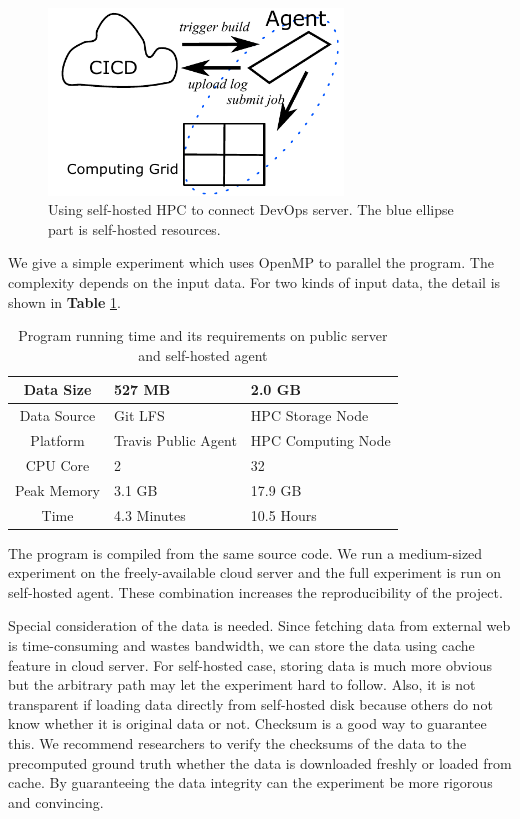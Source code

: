 \documentclass{IEEEcsmag}
\begin{document}
\begin{figure}[!ht]
\centerline{\includegraphics[width=18.5pc]{self-hosted.pdf}}
\caption{Using self-hosted HPC to connect DevOps server. The blue ellipse part is self-hosted resources.}\label{fig:selfhosted}
\end{figure}

We give a simple experiment which uses OpenMP to parallel the program. The complexity depends on the input data. For two kinds of input data, the detail is shown in {\bf Table} \ref{tab:time}.
\begin{table}
\centering
\begin{tabular}{|c|p{1.5cm}|p{1.5cm}|}
\hline
Data Size & 527 MB & 2.0 GB\\
\hline
Data Source & Git LFS & HPC Storage Node \\
\hline
Platform & Travis Public Agent & HPC Computing Node \\
\hline
CPU Core & 2 & 32  \\ 
\hline
Peak Memory  & 3.1 GB  & 17.9 GB\\ 
\hline
Time & 4.3 Minutes & 10.5 Hours \\
\hline
\end{tabular}
\caption{Program running time and its requirements on public server and self-hosted agent}\label{tab:time}
\end{table}

The program is compiled from the same source code. We run a medium-sized experiment on the freely-available cloud server and the full experiment is run on self-hosted agent. These combination increases the reproducibility of the project.

Special consideration of the data is needed. Since fetching data from external web is time-consuming and wastes bandwidth, we can store the data using cache feature in cloud server. For self-hosted case, storing data is much more obvious but the arbitrary path may let the experiment hard to follow. Also, it is not transparent if loading data directly from self-hosted disk because others do not know whether it is original data or not. Checksum is a good way to guarantee this. We recommend researchers to verify the checksums of the data to the precomputed ground truth whether the data is downloaded freshly or loaded from cache. By guaranteeing the data integrity can the experiment be more rigorous and convincing.
\end{document}
